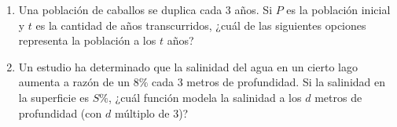 \documentclass[11pt, letterpaper]{article}
\begin{document}
\begin{enumerate}[label=\textbf{\arabic*.}, leftmargin=*]
\item
\begin{minipage}[t]{\linewidth}
Una población de caballos se duplica cada 3 años. Si $P$ es la población inicial y $t$ es la cantidad de años transcurridos, ¿cuál de las siguientes opciones representa la población a los $t$ años?
\\%
\begin{minipage}{\linewidth}
\vspace{7mm}
\end{minipage}
\vspace{7mm}
\end{minipage}

\item
\begin{minipage}[t]{\linewidth}
Un estudio ha determinado que la salinidad del agua en un cierto lago aumenta a razón de un $8\%$ cada 3 metros de profundidad. Si la salinidad en la superficie es $S\%$, ¿cuál función modela la salinidad a los $d$ metros de profundidad (con $d$ múltiplo de 3)?
\\%
\begin{minipage}{\linewidth}
\vspace{7mm}
\end{minipage}
\vspace{7mm}
\end{minipage}

\end{enumerate}
\end{document}

